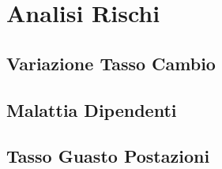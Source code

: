 \chapter[Analisi Rischi]{Analisi Rischi}

\section[Variazione Tasso Cambio]{Variazione Tasso Cambio}
	

\section[Malattia Dipendenti]{Malattia Dipendenti}
	

\section[Tasso Guasto Postazioni]{Tasso Guasto Postazioni}
	